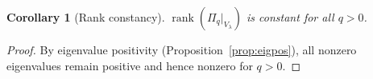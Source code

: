 \documentclass[11pt]{article}
\newtheorem{corollary}[theorem]{Corollary}
\theoremstyle{definition}
\theoremstyle{remark}
\DeclareMathOperator{\rank}{rank}
\begin{document}
\begin{corollary}[Rank constancy]
$\rank(\Pi_q|_{V_\lambda})$ is constant for all $q > 0$.
\end{corollary}
\begin{proof}
By eigenvalue positivity (Proposition~\ref{prop:eigpos}), all nonzero
eigenvalues remain positive and hence nonzero for $q > 0$.
\end{proof}
\end{document}
